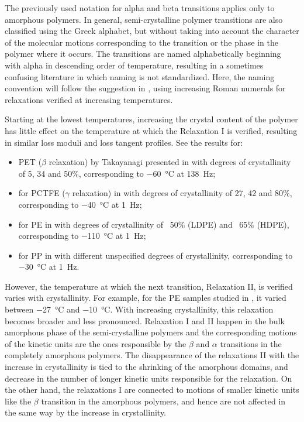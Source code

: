 The previously used notation for alpha and beta transitions applies only to amorphous polymers.
In general, semi-crystalline polymer transitions are also classified using the Greek alphabet, but without taking into account the character of the molecular motions corresponding to the transition or the phase in the polymer where it occurs.
The transitions are named alphabetically beginning with alpha in descending order of temperature, resulting in a sometimes confusing literature in which naming is not standardized.
Here, the naming convention will follow the suggestion in \cite{arzhakovRelaxationPhysicalMechanical2019}, using increasing Roman numerals for relaxations verified at increasing temperatures.

Starting at the lowest temperatures, increasing the crystal content of the polymer has little effect on the temperature at which the Relaxation I is verified, resulting in similar loss moduli and loss tangent profiles.
See the results for:
\begin{itemize}
	\item PET ($\beta$ relaxation) by Takayanagi presented in \cite{wardIntroductionMechanicalProperties2004} with degrees of crystallinity of 5, 34 and 50\%, corresponding to \SI{-60}{\celsius} at \SI{138}{\hertz};
	\item for PCTFE ($\gamma$ relaxation) in \cite{mccrumVariationInternalFriction1962} with degrees of crystallinity of 27, 42 and 80\%, corresponding to \SI{-40}{\celsius} at \SI{1}{\hertz};
	\item for PE in \cite{khannaDynamicMechanicalRelaxations1985} with degrees of crystallinity of ~50\% (LDPE) and ~65\% (HDPE), corresponding to \SI{-110}{\celsius} at \SI{1}{\hertz};
	\item for PP in \cite{mccrumStudyInternalFriction1959} with different unspecified degrees of crystallinity, corresponding to \SI{-30}{\celsius} at \SI{1}{\hertz}.
\end{itemize}

However, the temperature at which the next transition, Relaxation II, is verified varies with crystallinity.
For example, for the PE samples studied in \cite{khannaDynamicMechanicalRelaxations1985}, it varied between \SI{-27}{\celsius} and \SI{-10}{\celsius}.
With increasing crystallinity, this relaxation becomes broader and less pronounced.
Relaxation I and II happen in the bulk amorphous phase of the semi-crystalline polymers and the corresponding motions of the kinetic units are the ones responsible by the $\beta$ and $\alpha$ transitions in the completely amorphous polymers.
The disappearance of the relaxations II with the increase in crystallinity is tied to the shrinking of the amorphous domains, and decrease in the number of longer kinetic units responsible for the relaxation.
On the other hand, the relaxations I are connected to motions of smaller kinetic units like the $\beta$ transition in the amorphous polymers, and hence are not affected in the same way by the increase in crystallinity.

